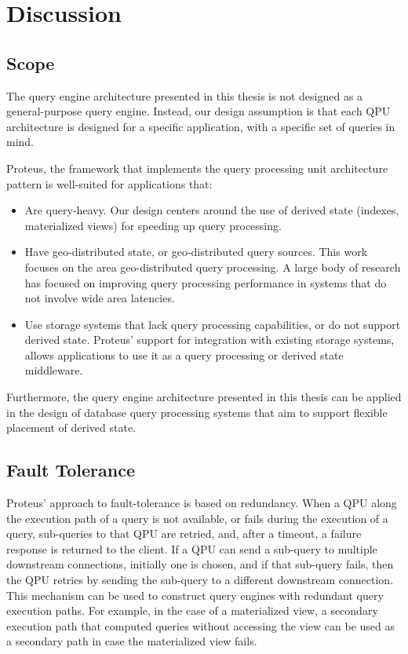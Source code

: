 \section{Discussion}

\subsection{Scope}
\label{sec:discussion_scope}
The query engine architecture presented in this thesis is not designed as a general-purpose query engine.
Instead, our design assumption is that each QPU architecture is designed for a specific application,
with a specific set of queries in mind.

Proteus, the framework that implements the query processing unit architecture pattern is well-suited for applications that:
\begin{itemize}
  \item Are query-heavy. Our design centers around the use of derived state (indexes, materialized views) for speeding up
  query processing.

  \item Have geo-distributed state, or geo-distributed query sources.
  This work focuses on the area geo-distributed query processing.
  A large body of research has focused on improving query processing performance in systems that do not involve
  wide area latencies.

  \item Use storage systems that lack query processing capabilities, or do not support derived state.
  Proteus' support for integration with existing storage systems,
  allows applications to use it as a query processing or derived state middleware.
\end{itemize}

Furthermore, the query engine architecture presented in this thesis can be applied in the design of database query processing
systems that aim to support flexible placement of derived state.

\subsection{Fault Tolerance}
\label{sec:discussion_fault_tolerance}
Proteus' approach to fault-tolerance is based on redundancy.
When a QPU along the execution path of a query is not available, or fails during the execution of a query,
sub-queries to that QPU are retried, and, after a timeout, a failure response is returned to the client.
If a QPU can send a sub-query to multiple downstream connections, initially one is chosen,
and if that sub-query fails, then the QPU retries by sending the sub-query to a different downstream connection.
This mechanism can be used to construct query engines with redundant query execution paths.
For example, in the case of a materialized view, a secondary execution path that computed queries without accessing
the view can be used as a secondary path in case the materialized view fails.

